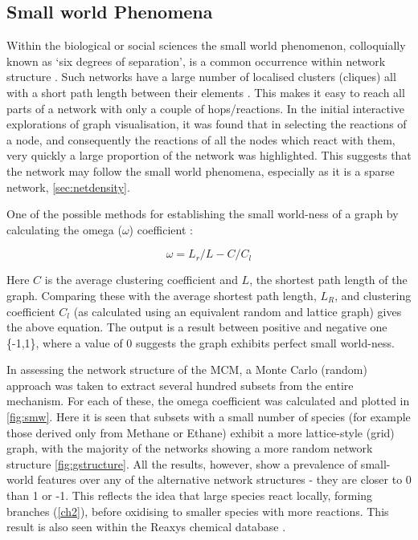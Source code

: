 \subsection{Small world Phenomena}
Within the biological or social sciences the small world phenomenon, colloquially known as `six degrees of separation', is a common occurrence within network structure \citep{smallworld}. Such networks have a large number of localised clusters (cliques) all with a short path length between their elements \citep{sm2}. This makes it easy to reach all parts of a network with only a couple of hops/reactions. In the initial interactive explorations of graph visualisation, it was found that in selecting the reactions of a node, and consequently the reactions of all the nodes which react with them, very quickly a large proportion of the network was highlighted. This suggests that the network may follow the small world phenomena, especially as it is a sparse network, \autoref{sec:netdensity}.

One of the possible methods for establishing the small world-ness of a graph by calculating the omega ($\omega$) coefficient \citep{networkx}:

\begin{equation}
\omega = L_r/L - C/C_l
\end{equation}

Here $C$ is the average clustering coefficient and $L$, the shortest path length of the graph. Comparing these with the average shortest path length, $L_R$, and clustering coefficient $C_l$ (as calculated using an equivalent random and lattice graph) gives the above equation. The output is a result between positive and negative one \{-1,1\}, where a value of 0 suggests the graph exhibits perfect small world-ness.

In assessing the network structure of the MCM, a Monte Carlo (random) approach was taken to extract several hundred subsets from the entire mechanism. For each of these, the omega coefficient was calculated and plotted in \autoref{fig:smw}. Here it is seen that subsets with a small number of species (for example those derived only from Methane or Ethane) exhibit a more lattice-style (grid) graph, with the majority of the networks showing a more random network structure \autoref{fig:gstructure}. All the results, however, show a prevalence of small-world features over any of the alternative network structures - they are closer to 0 than 1 or -1. This reflects the idea that large species react locally, forming branches (\autoref{ch2}), before oxidising to smaller species with more reactions. This result is also seen within the Reaxys chemical database \citep{rscgraph}.



